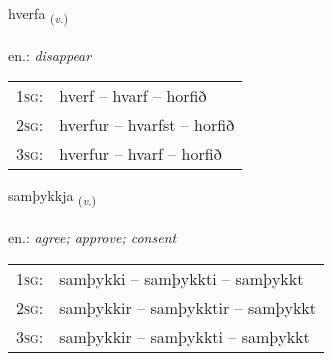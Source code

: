\documentclass[frontgrid, backgrid]{flacards}\usepackage[]{graphicx}\usepackage[]{xcolor}
\begin{document}
\renewcommand{\blhead}{\vskip5pt {\small\bfseries\footnotesize Sagnorð | Verb }}
\renewcommand{\bcfoot}{\vskip5pt \hspace{2pt}{\small\bfseries\footnotesize 1K}}


{hverfa \small{\textsubscript{(\textit{v.})}} \\[1ex] %
\textphonetic{[kʰvɛrva]} \\
en.: \emph{disappear} \\  [2ex]
\renewcommand*{\arraystretch}{0.8}
\begin{tabular}{p{1cm}l}
\textsc{1sg}: & hverf -- hvarf -- horfið \\ 
\textsc{2sg}: & hverfur -- hvarfst -- horfið \\ 
\textsc{3sg}: & hverfur -- hvarf -- horfið \\ 
\end{tabular}
}

\renewcommand{\flhead}{\vskip5pt \fboxsep=0pt {\small\bfseries\footnotesize Sagnorð | Verb}}
\renewcommand{\fcfoot}{\vskip5pt \fboxsep=0pt \hspace{2pt}{\small\bfseries\footnotesize 1K}}

\renewcommand{\blhead}{\vskip5pt {\small\bfseries\footnotesize Sagnorð | Verb }}
\renewcommand{\bcfoot}{\vskip5pt \hspace{2pt}{\small\bfseries\footnotesize 1K}}


{samþykkja \small{\textsubscript{(\textit{v.})}} \\[1ex] %
\textphonetic{[samθɪhca]} \\
en.: \emph{agree; approve; consent} \\  [2ex]
\renewcommand*{\arraystretch}{0.8}
\begin{tabular}{p{1cm}l}
\textsc{1sg}: & samþykki -- samþykkti -- samþykkt \\ 
\textsc{2sg}: & samþykkir -- samþykktir -- samþykkt \\ 
\textsc{3sg}: & samþykkir -- samþykkti -- samþykkt \\ 
\end{tabular}
}
\end{document}
